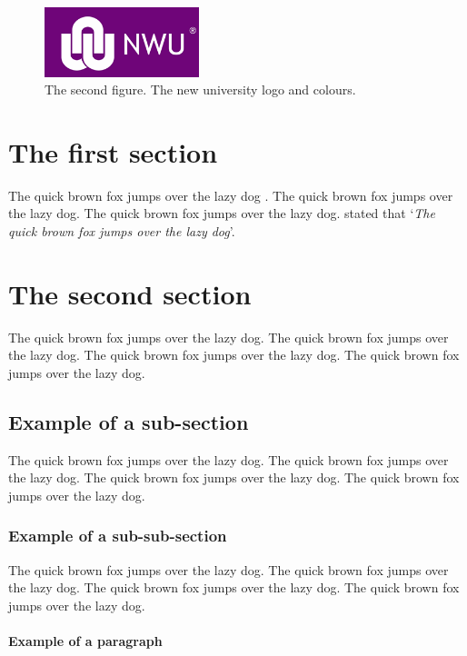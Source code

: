 \begin{figure}[!htbp!]%
\centering
\includegraphics[width=0.4\textwidth]{img/NWU2}%
\caption{The second figure. The new university logo and colours.}%
\label{fig:2}%
\end{figure}


\section{The first section}

The quick brown fox jumps over the lazy dog \citep{RN25}. 
The quick brown fox jumps over the lazy dog. 
The quick brown fox jumps over the lazy dog. 
\citet{RN25} stated that 
`\emph{The quick brown fox jumps over the lazy dog}'. 

\section{The second section}

The quick brown fox jumps over the lazy dog. 
The quick brown fox jumps over the lazy dog. 
The quick brown fox jumps over the lazy dog. 
The quick brown fox jumps over the lazy dog. 

\subsection{Example of a sub-section}

The quick brown fox jumps over the lazy dog. 
The quick brown fox jumps over the lazy dog. 
The quick brown fox jumps over the lazy dog. 
The quick brown fox jumps over the lazy dog. 

\subsubsection{Example of a sub-sub-section}

The quick brown fox jumps over the lazy dog. 
The quick brown fox jumps over the lazy dog. 
The quick brown fox jumps over the lazy dog. 
The quick brown fox jumps over the lazy dog. 

\paragraph{Example of a paragraph}

